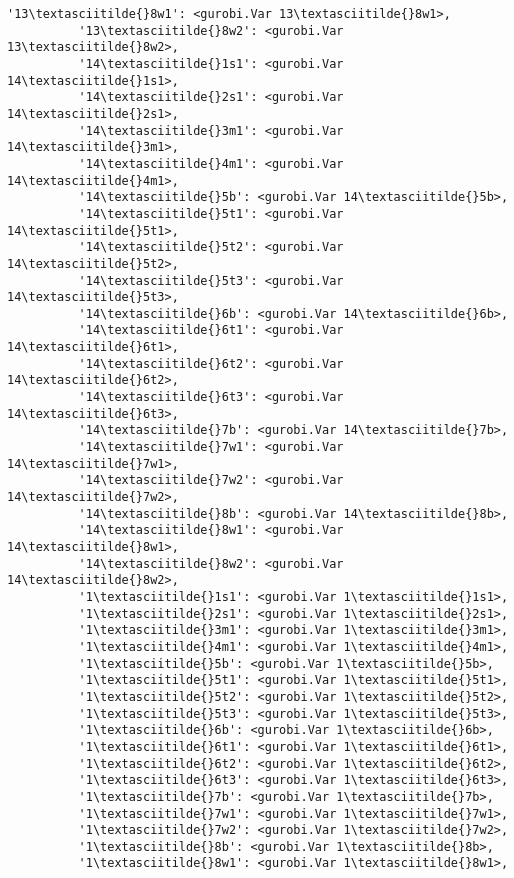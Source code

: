 \documentclass[11pt]{article}
\begin{document}
\begin{Verbatim}[commandchars=\\\{\}]
          '13\textasciitilde{}8w1': <gurobi.Var 13\textasciitilde{}8w1>,
          '13\textasciitilde{}8w2': <gurobi.Var 13\textasciitilde{}8w2>,
          '14\textasciitilde{}1s1': <gurobi.Var 14\textasciitilde{}1s1>,
          '14\textasciitilde{}2s1': <gurobi.Var 14\textasciitilde{}2s1>,
          '14\textasciitilde{}3m1': <gurobi.Var 14\textasciitilde{}3m1>,
          '14\textasciitilde{}4m1': <gurobi.Var 14\textasciitilde{}4m1>,
          '14\textasciitilde{}5b': <gurobi.Var 14\textasciitilde{}5b>,
          '14\textasciitilde{}5t1': <gurobi.Var 14\textasciitilde{}5t1>,
          '14\textasciitilde{}5t2': <gurobi.Var 14\textasciitilde{}5t2>,
          '14\textasciitilde{}5t3': <gurobi.Var 14\textasciitilde{}5t3>,
          '14\textasciitilde{}6b': <gurobi.Var 14\textasciitilde{}6b>,
          '14\textasciitilde{}6t1': <gurobi.Var 14\textasciitilde{}6t1>,
          '14\textasciitilde{}6t2': <gurobi.Var 14\textasciitilde{}6t2>,
          '14\textasciitilde{}6t3': <gurobi.Var 14\textasciitilde{}6t3>,
          '14\textasciitilde{}7b': <gurobi.Var 14\textasciitilde{}7b>,
          '14\textasciitilde{}7w1': <gurobi.Var 14\textasciitilde{}7w1>,
          '14\textasciitilde{}7w2': <gurobi.Var 14\textasciitilde{}7w2>,
          '14\textasciitilde{}8b': <gurobi.Var 14\textasciitilde{}8b>,
          '14\textasciitilde{}8w1': <gurobi.Var 14\textasciitilde{}8w1>,
          '14\textasciitilde{}8w2': <gurobi.Var 14\textasciitilde{}8w2>,
          '1\textasciitilde{}1s1': <gurobi.Var 1\textasciitilde{}1s1>,
          '1\textasciitilde{}2s1': <gurobi.Var 1\textasciitilde{}2s1>,
          '1\textasciitilde{}3m1': <gurobi.Var 1\textasciitilde{}3m1>,
          '1\textasciitilde{}4m1': <gurobi.Var 1\textasciitilde{}4m1>,
          '1\textasciitilde{}5b': <gurobi.Var 1\textasciitilde{}5b>,
          '1\textasciitilde{}5t1': <gurobi.Var 1\textasciitilde{}5t1>,
          '1\textasciitilde{}5t2': <gurobi.Var 1\textasciitilde{}5t2>,
          '1\textasciitilde{}5t3': <gurobi.Var 1\textasciitilde{}5t3>,
          '1\textasciitilde{}6b': <gurobi.Var 1\textasciitilde{}6b>,
          '1\textasciitilde{}6t1': <gurobi.Var 1\textasciitilde{}6t1>,
          '1\textasciitilde{}6t2': <gurobi.Var 1\textasciitilde{}6t2>,
          '1\textasciitilde{}6t3': <gurobi.Var 1\textasciitilde{}6t3>,
          '1\textasciitilde{}7b': <gurobi.Var 1\textasciitilde{}7b>,
          '1\textasciitilde{}7w1': <gurobi.Var 1\textasciitilde{}7w1>,
          '1\textasciitilde{}7w2': <gurobi.Var 1\textasciitilde{}7w2>,
          '1\textasciitilde{}8b': <gurobi.Var 1\textasciitilde{}8b>,
          '1\textasciitilde{}8w1': <gurobi.Var 1\textasciitilde{}8w1>,

\end{Verbatim}
\end{document}
